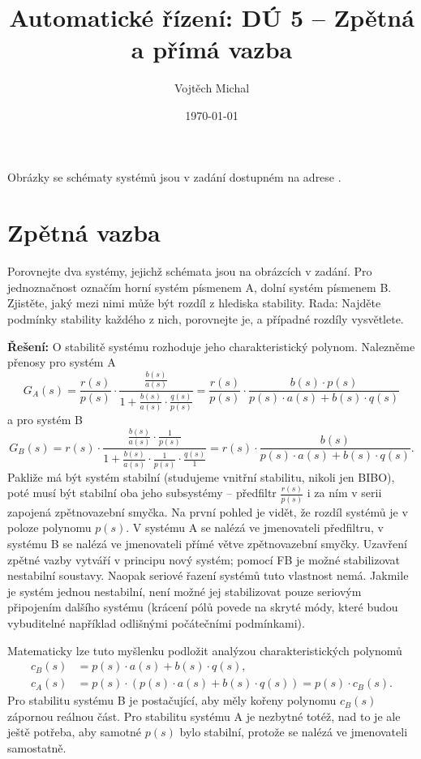 \documentclass[twoside]{article}
\title{Automatické řízení: DÚ 5 -- Zpětná a přímá vazba}
\author{Vojtěch Michal}
\date{\today}
\begin{document}
\maketitle

Obrázky se schématy systémů jsou v zadání dostupném na adrese \cite{zadani}.

\section{Zpětná vazba}
Porovnejte dva systémy, jejichž schémata jsou na obrázcích v zadání.
Pro jednoznačnost označím horní systém písmenem A, dolní systém písmenem B.
Zjistěte, jaký mezi nimi může být rozdíl z hlediska stability. Rada: Najděte podmínky stability každého
z nich, porovnejte je, a případné rozdíly vysvětlete.

\textbf{Řešení:}
O stabilitě systému rozhoduje jeho charakteristický polynom. Nalezněme přenosy pro systém A
\begin{equation}
	G_A(s) = \frac{r(s)}{p(s)} \cdot \frac{\frac{b(s)}{a(s)} }{1 + \frac{b(s)}{a(s)} \cdot \frac{q(s)}{p(s)}} =
	\frac{r(s)}{p(s)} \cdot \frac{b(s) \cdot p(s)}{p(s) \cdot a(s) + b(s) \cdot q(s)}
\end{equation}
a pro systém B
\begin{equation}
	G_B(s) = r(s) \cdot \frac{\frac{b(s)}{a(s)} \cdot \frac{1}{p(s)}}{1 + \frac{b(s)}{a(s)} \cdot \frac{1}{p(s)} \cdot \frac{q(s)}{1}} =
	r(s) \cdot \frac{b(s) }{p(s) \cdot a(s) + b(s) \cdot q(s)}.
\end{equation}
Pakliže má být systém stabilní (studujeme vnitřní stabilitu, nikoli jen BIBO), poté musí být stabilní oba jeho subsystémy -- předfiltr
$\frac{r(s)}{p(s)}$ i za ním v serii zapojená zpětnovazební smyčka. Na první pohled je vidět, že rozdíl systémů je v poloze
polynomu $p(s)$. V systému A se nalézá ve jmenovateli předfiltru, v systému B se nalézá ve jmenovateli přímé větve zpětnovazební
smyčky. Uzavření zpětné vazby vytváří v principu nový systém; pomocí FB je možné stabilizovat nestabilní soustavy.
Naopak seriové řazení systémů tuto vlastnost nemá. Jakmile je systém jednou nestabilní, není možné jej stabilizovat pouze 
seriovým připojením dalšího systému (krácení pólů povede na skryté módy, které budou vybuditelné například odlišnými
počátečními podmínkami).

Matematicky lze tuto myšlenku podložit analýzou charakteristických polynomů
\begin{equation}
	\begin{split}
		c_B(s) &= p(s) \cdot a(s) + b(s) \cdot q(s), \\
		c_A(s) &= p(s) \cdot (p(s) \cdot a(s) + b(s) \cdot q(s)) = p(s) \cdot c_B(s).
	\end{split}
\end{equation}
Pro stabilitu systému B je postačující, aby měly kořeny polynomu $c_B(s)$ zápornou reálnou část.
Pro stabilitu systému A je nezbytné totéž, nad to je ale ještě potřeba, aby samotné $p(s)$ bylo stabilní,
protože se nalézá ve jmenovateli samostatně.
\end{document}
